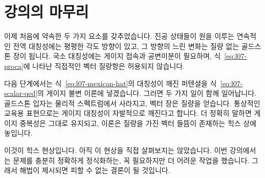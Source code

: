 \begin{classroomqa}
\end{classroomqa}

\section{강의의 마무리}

이제 처음에 약속한 두 가지 요소를 갖추었습니다. 진공 상태들이 원을 이루는 연속적인 전역 대칭성에는 평평한 각도 방향이 있고, 그 방향의 느린 변화는 질량 없는 골드스톤 장이 됩니다. 국소 대칭성에는 게이지 접속과 공변미분이 필요하며, 식~\eqref{eq:l07-proca}에 나타난 직접적인 벡터 질량항은 허용되지 않습니다.

다음 단계에서는 식~\eqref{eq:l07-mexican-hat}의 대칭성이 깨진 퍼텐셜을 식~\eqref{eq:l07-scalar-qed}의 게이지 불변 이론에 넣겠습니다. 그러면 두 가지 일이 함께 일어납니다. 골드스톤 입자는 물리적 스펙트럼에서 사라지고, 벡터 장은 질량을 얻습니다. 통상적인 교육용 표현으로는 게이지 대칭성이 자발적으로 깨진다고 합니다. 더 정확히 말하면 게이지 중복성은 그대로 유지되고, 이론은 질량을 가진 벡터 들뜸이 존재하는 힉스 상에 놓입니다.

이것이 힉스 현상입니다. 아직 이 현상을 직접 살펴보지는 않았습니다. 이번 강의에서는 문제를 충분히 정확하게 정식화하는, 꼭 필요하지만 더 어려운 작업을 했습니다. 그래서 해법이 제시되면 피할 수 없는 결론이 될 것입니다.